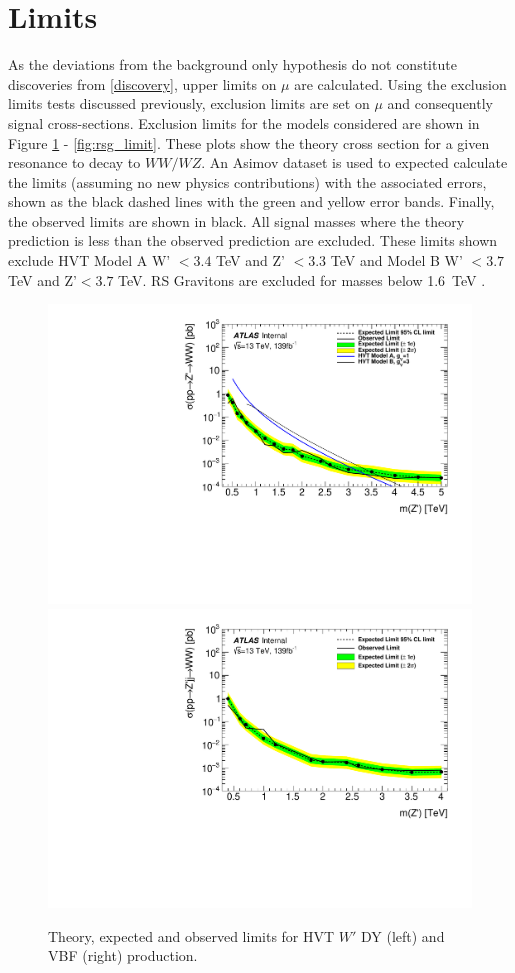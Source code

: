 \section{Limits}
As the deviations from the background only hypothesis do not constitute discoveries from \ref{discovery}, upper limits on $\mu$ are calculated. Using the exclusion limits tests discussed previously, exclusion limits are set on $\mu$ and consequently signal cross-sections. Exclusion limits for the models considered are shown in Figure \ref{fig:hvtww_limit} - \ref{fig:rsg_limit}. These plots show the theory cross section for a given resonance to decay to $WW/WZ$. An Asimov dataset is used to expected calculate the limits (assuming no new physics contributions) with the associated errors, shown as the black dashed lines with the green and yellow error bands. Finally, the observed limits are shown in black. All signal masses where the theory prediction is less than the observed prediction are excluded. These limits shown exclude HVT Model A W' $< 3.4$ TeV and Z' $< 3.3$ TeV and Model B W' $< 3.7$ TeV and Z'$ < 3.7$ TeV. RS Gravitons are excluded for masses below 1.6~TeV .


\begin{figure}[h!]
  \centering
  \includegraphics[width=0.48\hsize]{figures/results/limits/limits_hvtww.pdf}
  \includegraphics[width=0.48\hsize]{figures/results/limits/limits_hvtwwvbf.pdf}

 \caption{Theory, expected and observed limits for HVT $W'$ DY (left) and VBF (right) production.}
  \label{fig:hvtww_limit}
\end{figure} 
\FloatBarrier


